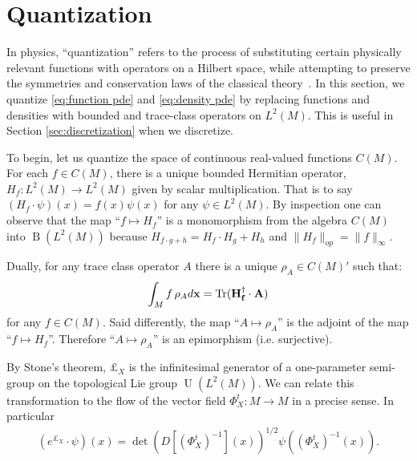 \documentclass[final,leqno]{siamart}
\newcommand{\pder}[2]{\ensuremath{\frac{ \partial #1}{\partial #2}}}
\DeclareMathOperator{\Tr}{Tr}
\begin{document}
\section{Quantization} \label{sec:quantization}
In physics, ``quantization'' refers to the process of substituting certain physically relevant functions with operators on a Hilbert space, while attempting to preserve the symmetries and conservation laws of the classical theory~\cite{BatesWeinstein1997,GuilleminSternberg1970}.
In this section, we quantize \eqref{eq:function pde} and \eqref{eq:density pde} by replacing functions and densities with bounded and trace-class operators on $L^{2}(M)$.
This is useful in Section \ref{sec:discretization} when we discretize.

To begin, let us quantize the space of continuous real-valued functions $C(M)$.
For each $f \in C(M)$, there is a unique bounded Hermitian operator, $H_{f} : L^{2}(M) \to L^{2}(M)$ given by scalar multiplication.
That is to say $(H_{f} \cdot \psi) (x) = f(x) \psi(x)$ for any $\psi \in L^{2}(M)$.
By inspection one can observe that the map ``$f \mapsto H_{f}$'' is a monomorphism from the algebra $C(M)$ into $\operatorname{B}( L^2(M))$ because $H_{f\cdot g + h} = H_{f} \cdot H_{g} + H_{h}$ and $\| H_{f} \|_{op} = \| f \|_{\infty}$.

Dually, for any trace class operator $A$ there is a unique $\rho_{A} \in C(M)'$ such that: 
\begin{align*}
	 \int_M f \, \rho_{A} d\bf{x} = \Tr ( H_{f}^{\dagger} \cdot A )
\end{align*}
for any $f \in C(M)$.
Said differently, the map ``$A \mapsto \rho_{A}$'' is the adjoint of the map ``$f \mapsto H_{f}$''. Therefore ``$A \mapsto \rho_{A}$'' is an epimorphism (i.e. surjective).


By Stone's theorem, $\pounds_X$ is the infinitesimal generator of a one-parameter semi-group on the topological Lie group $\operatorname{U}(L^2(M))$.
We can relate this transformation to the flow of the vector field $\Phi_X^t:M \to M$ in a precise sense.
In particular
\begin{align*}
	( e^{\pounds_X} \cdot \psi )(x) =  \det( D [(\Phi_X^t)^{-1}](x) )^{1/2} \psi( ( \Phi_X^t)^{-1} (x) ).
\end{align*}


\end{document}
